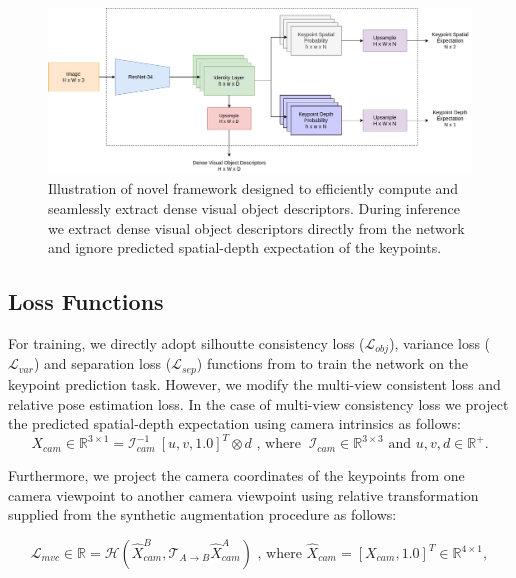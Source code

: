 \begin{figure}[htb]
    \centering
    \includegraphics[scale=0.35]{images/arch.png}
    \caption{Illustration of novel framework designed to efficiently compute and seamlessly extract dense visual object descriptors.
        During inference we extract dense visual object descriptors directly from the network and ignore predicted spatial-depth expectation of the keypoints.}
    \label{fig:modified_dnn}
\end{figure}


\subsection{Loss Functions}

For training, we directly adopt silhoutte consistency loss ($\mathcal{L}_{obj}$), variance loss ($\mathcal{L}_{var}$) and separation loss ($\mathcal{L}_{sep}$) functions from \cite{suwajanakorn2018discovery} to train the network on the keypoint prediction task.
However, we modify the multi-view consistent loss and relative pose estimation loss. In the case of multi-view consistency loss we
project the predicted spatial-depth expectation using camera intrinsics as follows:
\begin{equation}
    X_{cam} \in \mathbb{R}^{3 \times 1} = \mathcal{I}_{cam}^{-1}  \ [u, v, 1.0]^T \otimes d \text{ , where  } \ \mathcal{I}_{cam} \in \mathbb{R}^{3 \times 3} \text{ and }  u, v, d \in \mathbb{R}^+.
\end{equation}

Furthermore, we project the camera coordinates of the keypoints from one camera viewpoint to another camera viewpoint using relative transformation
supplied from the synthetic augmentation procedure as follows:

\begin{equation}
    \label{eqn:mvc}
    \mathcal{L}_{mvc} \in \mathbb{R} = \mathcal{H}(\hat{X}^B_{cam}, \mathcal{T}_{A \rightarrow B} \hat{X}^A_{cam}) \text{ , where  } \hat{X}_{cam}=[X_{cam}, 1.0]^T \in \mathbb{R}^{4 \times 1} ,
\end{equation}


